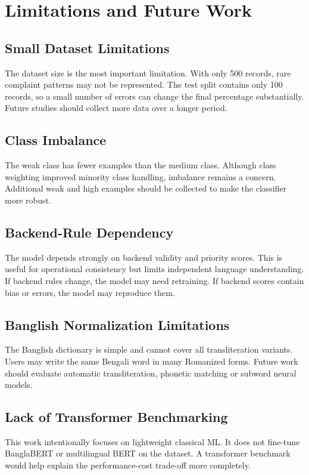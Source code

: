 \documentclass[12pt,a4paper,openany]{book}
\begin{document}
\chapter{Limitations and Future Work}

\section{Small Dataset Limitations}
The dataset size is the most important limitation. With only 500 records, rare complaint patterns may not be represented. The test split contains only 100 records, so a small number of errors can change the final percentage substantially. Future studies should collect more data over a longer period.

\section{Class Imbalance}
The weak class has fewer examples than the medium class. Although class weighting improved minority class handling, imbalance remains a concern. Additional weak and high examples should be collected to make the classifier more robust.

\section{Backend-Rule Dependency}
The model depends strongly on backend validity and priority scores. This is useful for operational consistency but limits independent language understanding. If backend rules change, the model may need retraining. If backend scores contain bias or errors, the model may reproduce them.

\section{Banglish Normalization Limitations}
The Banglish dictionary is simple and cannot cover all transliteration variants. Users may write the same Bengali word in many Romanized forms. Future work should evaluate automatic transliteration, phonetic matching or subword neural models.

\section{Lack of Transformer Benchmarking}
This work intentionally focuses on lightweight classical ML. It does not fine-tune BanglaBERT or multilingual BERT on the dataset. A transformer benchmark would help explain the performance-cost trade-off more completely.
\end{document}
